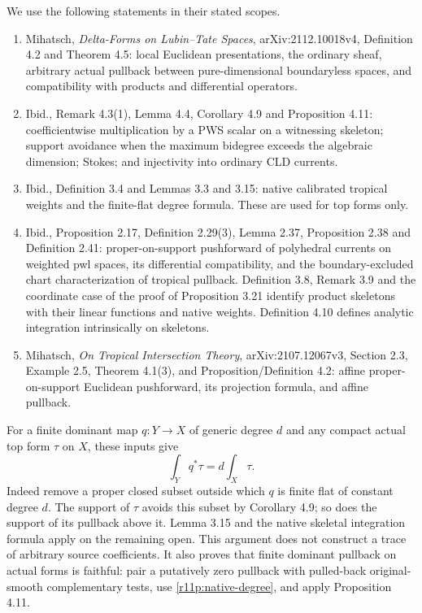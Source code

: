 \documentclass[11pt,a4paper]{article}
\theoremstyle{definition}
\theoremstyle{remark}
\begin{document}
We use the following statements in their stated scopes.
\begin{enumerate}
\item Mihatsch, \emph{Delta-Forms on Lubin--Tate Spaces},
arXiv:2112.10018v4, Definition 4.2 and Theorem 4.5: local Euclidean
presentations, the ordinary sheaf, arbitrary actual pullback between
pure-dimensional boundaryless spaces, and compatibility with products
and differential operators.
\item Ibid., Remark 4.3(1), Lemma 4.4, Corollary 4.9 and Proposition 4.11:
coefficientwise multiplication by a PWS scalar on a witnessing skeleton;
support avoidance when the maximum bidegree exceeds the algebraic
dimension; Stokes; and injectivity into ordinary CLD currents.
\item Ibid., Definition 3.4 and Lemmas 3.3 and 3.15:
native calibrated tropical weights and the finite-flat degree formula.
These are used for top forms only.
\item Ibid., Proposition 2.17, Definition 2.29(3), Lemma 2.37,
Proposition 2.38 and Definition 2.41: proper-on-support pushforward
of polyhedral currents on weighted pwl spaces, its differential
compatibility, and the boundary-excluded chart characterization of
tropical pullback.  Definition 3.8, Remark 3.9 and the coordinate case
of the proof of Proposition 3.21 identify product skeletons with their
linear functions and native weights.  Definition 4.10 defines analytic
integration intrinsically on skeletons.
\item Mihatsch, \emph{On Tropical Intersection Theory},
arXiv:2107.12067v3, Section 2.3, Example 2.5, Theorem 4.1(3), and
Proposition/Definition 4.2: affine proper-on-support Euclidean
pushforward, its projection formula, and affine pullback.
\end{enumerate}

For a finite dominant map $q:Y\to X$ of generic degree $d$ and any compact
actual top form $\tau$ on $X$, these inputs give
\[
                            \int_Yq^*\tau=d\int_X\tau.
\tag{MT2}\label{r11p:native-degree}
\]
Indeed remove a proper closed subset outside which $q$ is finite flat of
constant degree $d$.  The support of $\tau$ avoids this subset by
Corollary 4.9; so does the support of its pullback above it.
Lemma 3.15 and the native skeletal integration formula apply on the
remaining open.  This argument does not construct a trace of arbitrary
source coefficients.  It also proves that finite dominant pullback on
actual forms is faithful: pair a putatively zero pullback with pulled-back
original-smooth complementary tests, use \eqref{r11p:native-degree}, and
apply Proposition 4.11.
\end{document}

